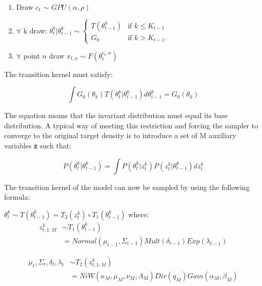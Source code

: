 \documentclass[twoside,hidelinks]{article}
\begin{document}
\noindent\makebox[\linewidth]{\rule{\textwidth}{0.4pt}}
\begin{enumerate}
	\item Draw  $c_t$ $\sim$ $GPU(\alpha, \rho) $
	\item $\forall$  k draw: $ \theta_t^k | \theta_{t-1}^k \sim
	\begin{cases} T (\theta_{t-1}^k) &\mbox{if } k \leq K_{t-1} \\
	G_0 & \mbox{if } k > K_{t-1}. \end{cases}$
	\item $\forall$  point $n$ draw $ x_{t,n} \sim F(\theta_t^{c_t,n})$
\end{enumerate}
\noindent\makebox[\linewidth]{\rule{\textwidth}{0.4pt}}
The transition kernel must satisfy\cite{caron}:

\begin{equation}
\int G_0(\theta_k) T(\theta_t^k | \theta_{t-1}^k) d\theta_{t-1}^k =  G_0(\theta_k)
\end{equation}

The equation means that the invariant distribution must equal its base distribution. A typical way of meeting this restriction and forcing the sampler to converge to the original target density\cite{smc:theory} is to introduce a set of M auxiliary variables \textbf{z} such that:

\begin{equation}
    P(\theta_t^k | \theta_{t-1}^k) =  \int P(\theta_t^k | z_{t}^k)   P(z_t^k| \theta_{t-1}^k) dz_t^k
\end{equation}

The transition kernel of the model can now be sampled by using the following formula:

$\theta_t^k \sim T(\theta_{t-1}^k) = T_2(z_t^k) \circ T_1(\theta_{t-1}^k)$ where:
\begin{equation} \label{eq1}
\begin{split}
    z_{t,1:M}^k  & \sim T_1(\theta_{t-1}^k)\\
 & = Normal(\mu_{t-1}, \Sigma_{t-1}) Mult( \delta_{t-1}) Exp( \lambda_{t-1})
\end{split}
\end{equation}

\begin{equation}
\begin{split}
    \mu_t, \Sigma_t, \delta_t,  \lambda_t & \sim T_2(z_{t,1:M}^k)\\
 & = NiW( \kappa_M, \mu_M, \nu_M, \Lambda_M ) Dir(q_M) Gam(\alpha_M, \beta_M) 
\end{split}
\end{equation}
\end{document}
